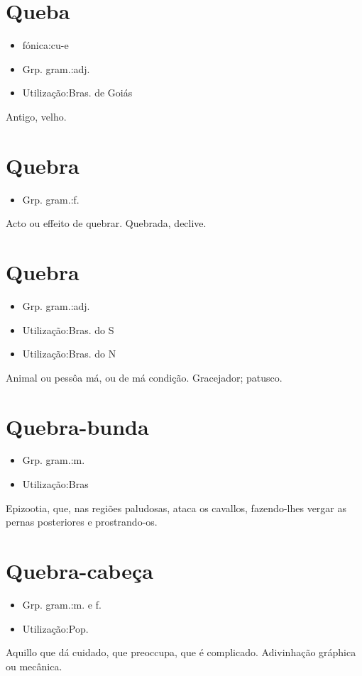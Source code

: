 \section{Queba}
\begin{itemize}
\item {fónica:cu-e}
\end{itemize}
\begin{itemize}
\item {Grp. gram.:adj.}
\end{itemize}
\begin{itemize}
\item {Utilização:Bras. de Goiás}
\end{itemize}
Antigo, velho.
\section{Quebra}
\begin{itemize}
\item {Grp. gram.:f.}
\end{itemize}
Acto ou effeito de quebrar.
Quebrada, declive.
\section{Quebra}
\begin{itemize}
\item {Grp. gram.:adj.}
\end{itemize}
\begin{itemize}
\item {Utilização:Bras. do S}
\end{itemize}
\begin{itemize}
\item {Utilização:Bras. do N}
\end{itemize}
Animal ou pessôa má, ou de má condição.
Gracejador; patusco.
\section{Quebra-bunda}
\begin{itemize}
\item {Grp. gram.:m.}
\end{itemize}
\begin{itemize}
\item {Utilização:Bras}
\end{itemize}
Epizootia, que, nas regiões paludosas, ataca os cavallos, fazendo-lhes vergar as pernas posteriores e prostrando-os.
\section{Quebra-cabeça}
\begin{itemize}
\item {Grp. gram.:m.  e  f.}
\end{itemize}
\begin{itemize}
\item {Utilização:Pop.}
\end{itemize}
Aquillo que dá cuidado, que preoccupa, que é complicado.
Adivinhação gráphica ou mecânica.
